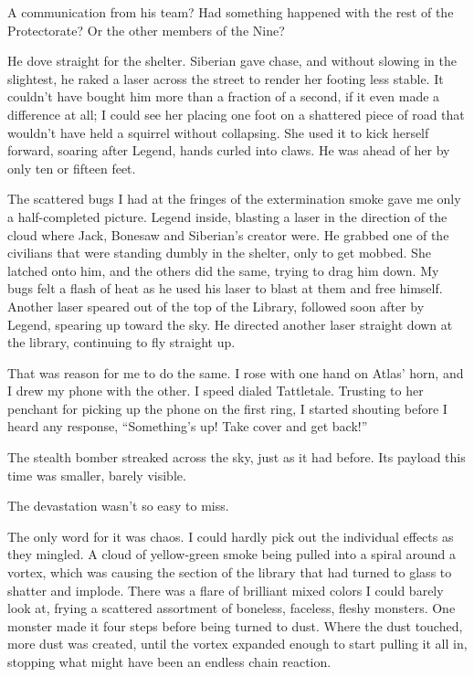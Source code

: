 A communication from his team?  Had something happened with the rest of the Protectorate?  Or the other members of the Nine?



He dove straight for the shelter.  Siberian gave chase, and without slowing in the slightest, he raked a laser across the street to render her footing less stable.  It couldn't have bought him more than a fraction of a second, if it even made a difference at all;  I could see her placing one foot on a shattered piece of road that wouldn't have held a squirrel without collapsing.  She used it to kick herself forward, soaring after Legend, hands curled into claws.  He was ahead of her by only ten or fifteen feet.



The scattered bugs I had at the fringes of the extermination smoke gave me only a half-completed picture.  Legend inside, blasting a laser in the direction of the cloud where Jack, Bonesaw and Siberian's creator were.  He grabbed one of the civilians that were standing dumbly in the shelter, only to get mobbed.  She latched onto him, and the others did the same, trying to drag him down.  My bugs felt a flash of heat as he used his laser to blast at them and free himself.  Another laser speared out of the top of the Library, followed soon after by Legend, spearing up toward the sky.  He directed another laser straight down at the library, continuing to fly straight up.



That was reason for me to do the same.  I rose with one hand on Atlas' horn, and I drew my phone with the other.  I speed dialed Tattletale.  Trusting to her penchant for picking up the phone on the first ring, I started shouting before I heard any response, ``Something's up!  Take cover and get back!''



The stealth bomber streaked across the sky, just as it had before.  Its payload this time was smaller, barely visible.



The devastation wasn't so easy to miss.



The only word for it was chaos.  I could hardly pick out the individual effects as they mingled.  A cloud of yellow-green smoke being pulled into a spiral around a vortex, which was causing the section of the library that had turned to glass to shatter and implode.  There was a flare of brilliant mixed colors I could barely look at, frying a scattered assortment of boneless, faceless, fleshy monsters.  One monster made it four steps before being turned to dust.  Where the dust touched, more dust was created, until the vortex expanded enough to start pulling it all in, stopping what might have been an endless chain reaction.



